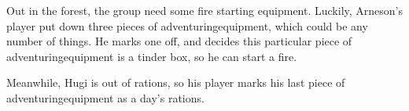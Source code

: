 \begin{exampletext}
  Out in the forest, the group need some fire starting equipment.
  Luckily, Arneson's player put down three pieces of \gls{adventuringequipment}, which could be any number of things.
  He marks one off, and decides this particular piece of \gls{adventuringequipment} is a tinder box, so he can start a fire.

  Meanwhile, Hugi is out of rations, so his player marks his last piece of \gls{adventuringequipment} as a day's rations.

\end{exampletext}
